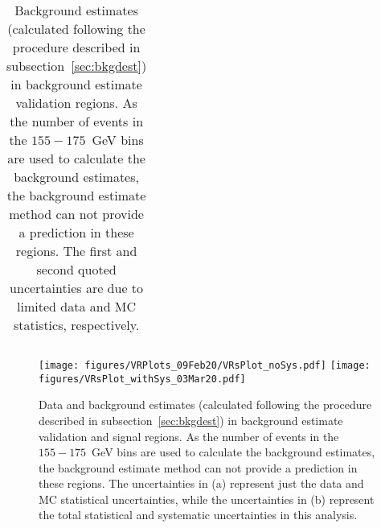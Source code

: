 \documentclass[NOTE, atlasdraft=true, texlive=2017, UKenglish]{\ATLASLATEXPATH atlasdoc}
\begin{document}
\begin{table}[!htbp]
{\begin{center}
\begin{tabular}{c|c|c|c|c|c|}
        \hline
      \end{tabular}
      \caption{Background estimates (calculated following the procedure described in subsection~\ref{sec:bkgdest}) in background estimate validation regions. As the number of events in the $155-175$~GeV bins are used to calculate the background estimates, the background estimate method can not provide a prediction in these regions. The first and second quoted uncertainties are due to limited data and MC statistics, respectively.}
      \label{tab:vrsest}
  \end{center}}
\end{table}

\begin{figure}[!htbp]
  \centering
  \texttt{[image: figures/VRPlots\_09Feb20/VRsPlot\_noSys.pdf]}
  \texttt{[image: figures/VRsPlot\_withSys\_03Mar20.pdf]}
  \caption{Data and background estimates (calculated following the procedure described in subsection~\ref{sec:bkgdest}) in background estimate validation and signal regions. As the number of events in the $155-175$~GeV bins are used to calculate the background estimates, the background estimate method can not provide a prediction in these regions. The uncertainties in (a) represent just the data and MC statistical uncertainties, while the uncertainties in (b) represent the total statistical and systematic uncertainties in this analysis.}
  \label{fig:bkgdvrs}
\end{figure}
\end{document}
